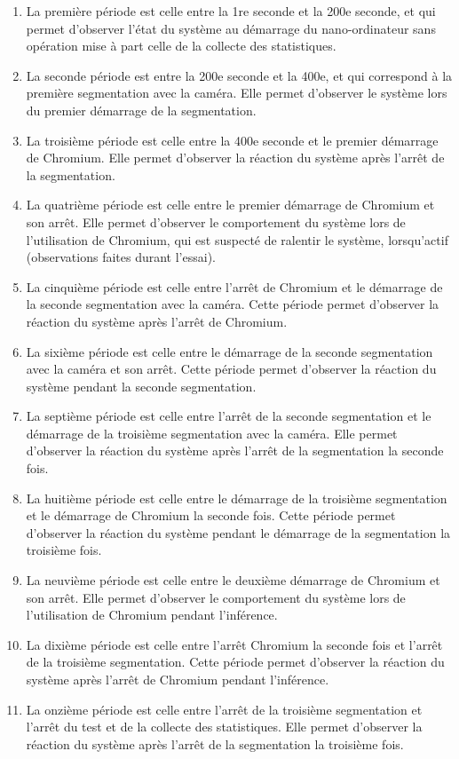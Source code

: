 \begin{enumerate}
   \item La première période est celle entre la 1re seconde et la 200e seconde, et qui permet d'observer l'état du système au démarrage du nano-ordinateur sans opération mise à part celle de la collecte des statistiques. 
   \item La seconde période est entre la 200e seconde et la 400e, et qui correspond à la première segmentation avec la caméra. Elle permet d'observer le système lors du premier démarrage de la segmentation. 
   \item La troisième période est celle entre la 400e seconde et le premier démarrage de Chromium. Elle permet d'observer la réaction du système après l'arrêt de la segmentation. 
   \item La quatrième période est celle entre le premier démarrage de Chromium et son arrêt. Elle permet d'observer le comportement du système lors de l'utilisation de Chromium, qui est suspecté de ralentir le système, lorsqu'actif (observations faites durant l'essai).
   \item La cinquième période est celle entre l'arrêt de Chromium et le démarrage de la seconde segmentation avec la caméra. Cette période permet d'observer la réaction du système après l'arrêt de Chromium. 
   \item La sixième période est celle entre le démarrage de la seconde segmentation avec la caméra et son arrêt. Cette période permet d'observer la réaction du système pendant la seconde segmentation. 
   \item La septième période est celle entre l'arrêt de la seconde segmentation et le démarrage de la troisième segmentation avec la caméra. Elle permet d'observer la réaction du système après l'arrêt de la segmentation la seconde fois. 
   \item La huitième période est celle entre le démarrage de la troisième segmentation et le démarrage de Chromium la seconde fois. Cette période permet d'observer la réaction du système pendant le démarrage de la segmentation la troisième fois. 
   \item La neuvième période est celle entre le deuxième démarrage de Chromium et son arrêt. Elle permet d'observer le comportement du système lors de l'utilisation de Chromium pendant l'inférence.
   \item La dixième période est celle entre l'arrêt Chromium la seconde fois et l'arrêt de la troisième segmentation. Cette période permet d'observer la réaction du système après l'arrêt de Chromium pendant l'inférence. 
   \item La onzième période est celle entre l'arrêt de la troisième segmentation et l'arrêt du test et de la collecte des statistiques. Elle permet d'observer la réaction du système après l'arrêt de la segmentation la troisième fois. 
\end{enumerate} 
